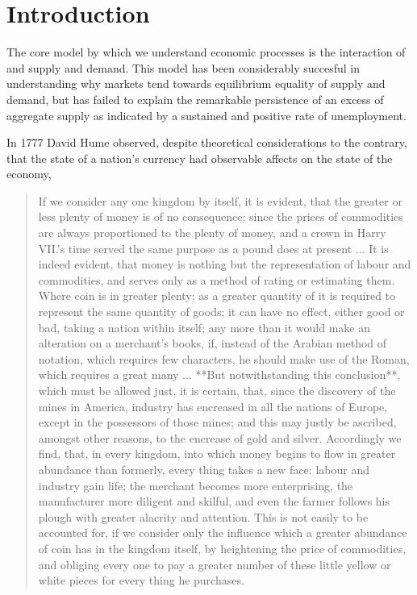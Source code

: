 \section{Introduction}

The core model by which we understand economic processes is the interaction of and supply and
demand. This model has been considerably succesful in understanding why markets tend towards
equilibrium equality of supply and demand, but has failed to explain the remarkable persistence of
an excess of aggregate supply as indicated by a sustained and positive rate of unemployment.

In 1777 David Hume observed, despite theoretical considerations to the contrary, that the
state of a nation's currency had observable affects on the state of the economy,

\begin{quotation}
If we consider any one kingdom by itself, it is evident, that the greater or less plenty of money
is of no consequence; since the prices of commodities are always proportioned to the plenty of
money, and a crown in Harry VII.’s time served the same purpose as a pound does at present ... It is
indeed evident, that money is nothing but the representation of labour and commodities, and serves
only as a method of rating or estimating them. Where coin is in greater plenty; as a greater
quantity of it is required to represent the same quantity of goods; it can have no effect, either
good or bad, taking a nation within itself; any more than it would make an alteration on a
merchant’s books, if, instead of the Arabian method of notation, which requires few characters, he
should make use of the Roman, which requires a great many ... **But notwithstanding this
conclusion**, which must be allowed just, it is certain, that, since the discovery of the mines in
America, industry has encreased in all the nations of Europe, except in the possessors of those
mines; and this may justly be ascribed, amongst other reasons, to the encrease of gold and silver.
Accordingly we find, that, in every kingdom, into which money begins to flow in greater abundance
than formerly, every thing takes a new face: labour and industry gain life; the merchant becomes
more enterprising, the manufacturer more diligent and skilful, and even the farmer follows his
plough with greater alacrity and attention. This is not easily to be accounted for, if we consider
only the influence which a greater abundance of coin has in the kingdom itself, by heightening the
price of commodities, and obliging every one to pay a greater number of these little yellow or white
pieces for every thing he purchases.
\end{quotation}

